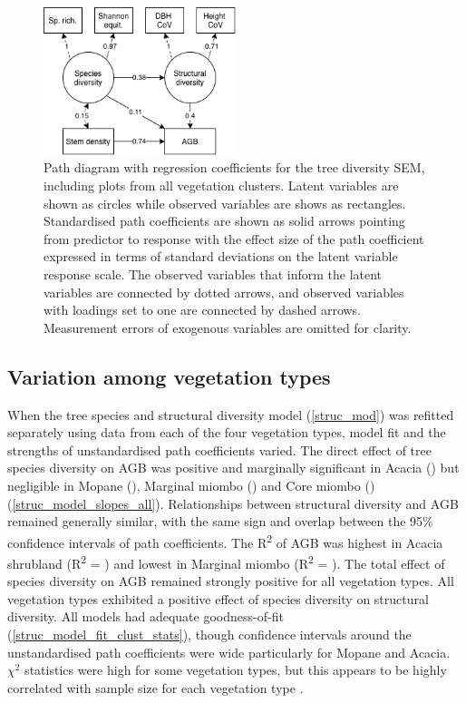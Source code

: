 \documentclass[11pt,a4paper]{article}
\begin{document}
\begin{figure}[H]
\centering
	\includegraphics[width=0.5\textwidth]{struc}
	\caption{Path diagram with regression coefficients for the tree diversity SEM, including plots from all vegetation clusters. Latent variables are shown as circles while observed variables are shows as rectangles. Standardised path coefficients are shown as solid arrows pointing from predictor to response with the effect size of the path coefficient expressed in terms of standard deviations on the latent variable response scale. The observed variables that inform the latent variables are connected by dotted arrows, and observed variables with loadings set to one are connected by dashed arrows. Measurement errors of exogenous variables are omitted for clarity.}
	\label{struc_mod}
\end{figure}

\subsection{Variation among vegetation types}

When the tree species and structural diversity model (\autoref{struc_mod}) was refitted separately using data from each of the four vegetation types, model fit and the strengths of unstandardised path coefficients varied. The direct effect of tree species diversity on AGB was positive and marginally significant in Acacia (\strucbetacsb{}) but negligible in Mopane (\strucbetadsb{}), Marginal miombo (\strucbetaasb{}) and Core miombo (\strucbetabsb{}) (\autoref{struc_model_slopes_all}). Relationships between structural diversity and AGB remained generally similar, with the same sign and overlap between the 95\% confidence intervals of path coefficients. The R\textsuperscript{2} of AGB was highest in Acacia shrubland (R\textsuperscript{2} = \struccrsq{}) and lowest in Marginal miombo (R\textsuperscript{2} = \strucarsq{}). The total effect of species diversity on AGB remained strongly positive for all vegetation types. All vegetation types exhibited a positive effect of species diversity on structural diversity. All models had adequate goodness-of-fit (\autoref{struc_model_fit_clust_stats}), though confidence intervals around the unstandardised path coefficients were wide particularly for Mopane and Acacia. $\chi^{2}$ statistics were high for some vegetation types, but this appears to be highly correlated with sample size for each vegetation type \citep{Hooper2008}.
\end{document}
